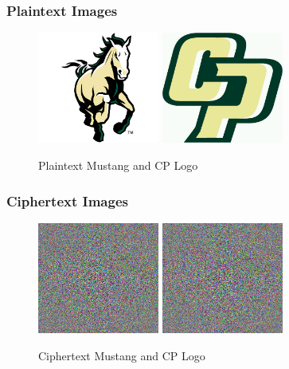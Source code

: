 \documentclass[11pt]{article}
\begin{document}
    \subsubsection{Plaintext Images}
      \begin{figure}[ht!p]
        \centering
        \includegraphics[width=4cm]{Images/mustang.jpg}
        \includegraphics[width=4cm]{Images/cp-logo.jpg}
        \caption{Plaintext Mustang and CP Logo}
        \label{fig:Plaintext_Images_Task4}
      \end{figure}

    \pagebreak
    \subsubsection{Ciphertext Images}
      \begin{figure}[ht!p]
        \centering
        \includegraphics[width=4cm]{Images/mustang-2tp.jpg}
        \includegraphics[width=4cm]{Images/cp-logo-2tp.jpg}
        \caption{Ciphertext Mustang and CP Logo}
        \label{fig:Ciphertext_Images_Task4}
      \end{figure}
  
\end{document}
